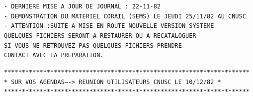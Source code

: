 \texttt{- DERNIERE MISE A JOUR DE JOURNAL : 22-11-82}\\
\texttt{- DEMONSTRATION DU MATERIEL CORAIL (SEMS) LE JEUDI 25/11/82 AU CNUSC}\\
\texttt{- ATTENTION :\quad SUITE A MISE EN ROUTE NOUVELLE VERSION SYSTEME}\\
\texttt{QUELQUES FICHIERS SERONT A RESTAURER OU A RECATALOGUER}\\
\texttt{SI VOUS NE RETROUVEZ PAS QUELQUES FICHIERS PRENDRE}\\
\texttt{CONTACT AVEC LA PREPARATION.}

{\scriptsize\texttt{*********************************************************************}\\
\texttt{* SUR VOS AGENDAS----> REUNION UTILISATEURS CNUSC LE 10/12/82\qquad\ *}\\
\texttt{*********************************************************************}}



